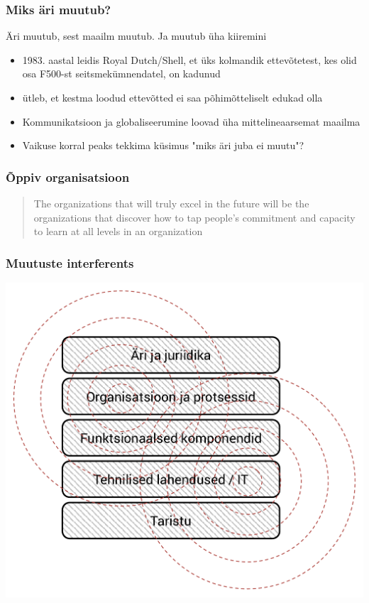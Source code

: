 \begin{frame}[fragile]
  \frametitle{Miks äri muutub?}
  Äri muutub, sest maailm muutub. Ja muutub üha kiiremini
	\begin{itemize}
		\item 1983. aastal leidis Royal Dutch/Shell, et üks kolmandik ettevõtetest, kes olid osa F500-st seitsmekümnendatel, on kadunud \citep{senge19905th}
		\item \cite{foster2011creative} ütleb, et kestma loodud ettevõtted ei saa põhimõtteliselt edukad olla
		\item Kommunikatsioon ja globaliseerumine loovad üha mittelineaarsemat maailma
		\item Vaikuse korral peaks tekkima küsimus "miks äri juba ei muutu"?
	\end{itemize}
\end{frame}

\begin{frame}[fragile]
  \frametitle{Õppiv organisatsioon}
  \begin{center}
  	\begin{quote}
		The organizations that will truly excel in the future will be the organizations that discover how to tap people's commitment and capacity to learn at all levels in an organization
	\end{quote}
  \end{center}
  \cite{senge19905th}
\end{frame}

\begin{frame}[fragile]
  \frametitle{Muutuste interferents}
  	\begin{center}
			\includegraphics[width=.7\textwidth]{stack_interference.pdf}
	\end{center}
\end{frame}


